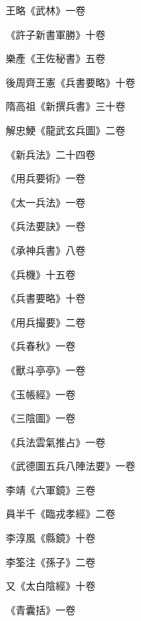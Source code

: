 \begin{pinyinscope}
 王略《武林》一卷



 《許子新書軍勝》十卷



 樂產《王佐秘書》五卷



 後周齊王憲《兵書要略》十卷



 隋高祖《新撰兵書》三十卷



 解忠鯁《龍武玄兵圖》二卷



 《新兵法》二十四卷



 《用兵要術》一卷



 《太一兵法》一卷



 《兵法要訣》一卷



 《承神兵書》八卷



 《兵機》十五卷



 《兵書要略》十卷



 《用兵撮要》二卷



 《兵春秋》一卷



 《獸斗亭亭》一卷



 《玉帳經》一卷



 《三陰圖》一卷



 《兵法雲氣推占》一卷



 《武德圖五兵八陣法要》一卷



 李靖《六軍鏡》三卷



 員半千《臨戎孝經》二卷



 李淳風《縣鏡》十卷



 李筌注《孫子》二卷



 又《太白陰經》十卷



 《青囊括》一卷




\end{pinyinscope}
